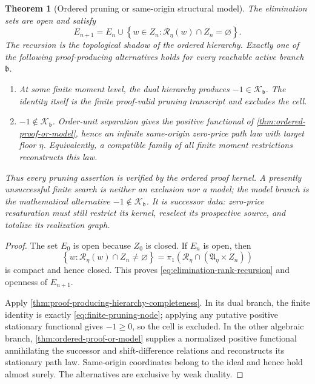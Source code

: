 \documentclass[11pt]{article}
\numberwithin{section}{part}
\theoremstyle{plain}
\newtheorem{theorem}{Theorem}[section]
\theoremstyle{definition}
\theoremstyle{remark}
\begin{document}
\begin{theorem}[Ordered pruning or same-origin structural model]
\label{thm:canonical-finite-pruning-transcript}
The elimination sets are open and satisfy
\begin{equation}
 \label{eq:elimination-rank-recursion}
 E_{n+1}
 =E_n\cup
 \left\{w\in Z_n:
   \mathcal R_\eta(w)\cap Z_n=\varnothing\right\}.
\end{equation}
The recursion is the topological shadow of the ordered hierarchy.  Exactly one
of the following proof-producing alternatives holds for every reachable
active branch \(\mathfrak b\).
\begin{enumerate}[label=\textup{(P\arabic*)}]
\item At some finite moment level, the dual hierarchy produces
\(-1\in\mathcal K_{\mathfrak b}\).  The identity itself is the finite proof-valid
pruning transcript and excludes the cell.
\item \(-1\notin\mathcal K_{\mathfrak b}\).  Order-unit separation gives the
positive functional of \cref{thm:ordered-proof-or-model}, hence an infinite
same-origin zero-price path law with target floor \(\eta\).  Equivalently, a
compatible family of all finite moment restrictions reconstructs this law.
\end{enumerate}
Thus every pruning assertion is verified by the ordered proof kernel.  A
presently unsuccessful finite search is neither an exclusion nor a model; the
model branch is the mathematical alternative \(-1\notin\mathcal K_{\mathfrak b}\).
It is successor data: zero-price resaturation must still restrict its kernel,
reselect its prospective source, and totalize its realization graph.
\end{theorem}

\begin{proof}
The set \(E_0\) is open because \(Z_0\) is closed.  If \(E_n\) is open, then
\begin{equation*}
 \left\{w:\mathcal R_\eta(w)\cap Z_n\ne\varnothing\right\}
 =\pi_1\!\left(
   \mathcal R_\eta\cap(\mathfrak A_\eta\times Z_n)
  \right)
\end{equation*}
is compact and hence closed.  This proves
\eqref{eq:elimination-rank-recursion} and openness of \(E_{n+1}\).

Apply \cref{thm:proof-producing-hierarchy-completeness}.  In its dual branch,
the finite identity is exactly \eqref{eq:finite-pruning-node}; applying any
putative positive stationary functional gives \(-1\ge0\), so the cell is
excluded.  In the other algebraic branch,
\cref{thm:ordered-proof-or-model} supplies a normalized positive functional
annihilating the successor and shift-difference relations and reconstructs its
stationary path law.
Same-origin coordinates belong to the ideal and hence hold almost surely.
The alternatives are exclusive by weak duality.
\end{proof}
\end{document}
